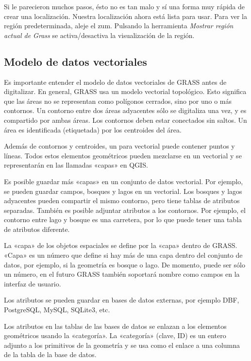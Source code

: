 Si le parecieron muchos pasos, ésto no es tan malo y sí una forma muy rápida de crear una localización. Nuestra localización ahora está lista para usar. Para ver la región predeterminada, aleje el zum. Pulsando la herramienta \textsl{Mostrar región actual de Grass} se activa/desactiva la visualización de la región.

\subsection{Modelo de datos vectoriales}\label{label_vectmodel}

Es importante entender el modelo de datos vectoriales de GRASS antes de digitalizar. En general, GRASS usa un modelo vectorial topológico. Esto significa que las áreas no se representan como polígonos cerrados, sino por uno o más contornos. Un contorno entre dos áreas adyacentes sólo se digitaliza una vez, y es compartido por ambas áreas. Los contornos deben estar conectados sin saltos. Un área es identificada (etiquetada) por los centroides del área.

Además de contornos y centroides, un para vectorial puede contener puntos y líneas. Todos estos elementos geométricos pueden mezclarse en un vectorial y se representarán en las llamadas «capas» en QGIS.

Es posible guardar más «capas» en un conjunto de datos vectorial. Por ejemplo, se pueden guardar campos, bosques y lagos en un vectorial. Los bosques y lagos adyacentes pueden compartir el mismo contorno, pero tiene tablas de atributos separadas. También es posible adjuntar atributos a los contornos. Por ejemplo, el contorno entre lago y bosque es una carretera, por lo que puede tener una tabla de atributos diferente.

La «capa» de los objetos espaciales se define por la «capa» dentro de GRASS. «Capa» es un número que define si hay más de una capa dentro del conjunto de datos, por ejemplo, si la geometría es bosque o lago. De momento, puede ser sólo un número, en el futuro GRASS también soportará nombre como campos en la interfaz de usuario.

Los atributos se pueden guardar en bases de datos externas, por ejemplo DBF, PostgreSQL, MySQL, SQLite3, etc.

Los atributos en las tablas de las bases de datos se enlazan a los elementos geométricos usando la «categoría». La «categoría» (clave, ID) es un entero adjunto a los primitivos de la geometría y se usa como el enlace a una columna de la tabla de la base de datos.

